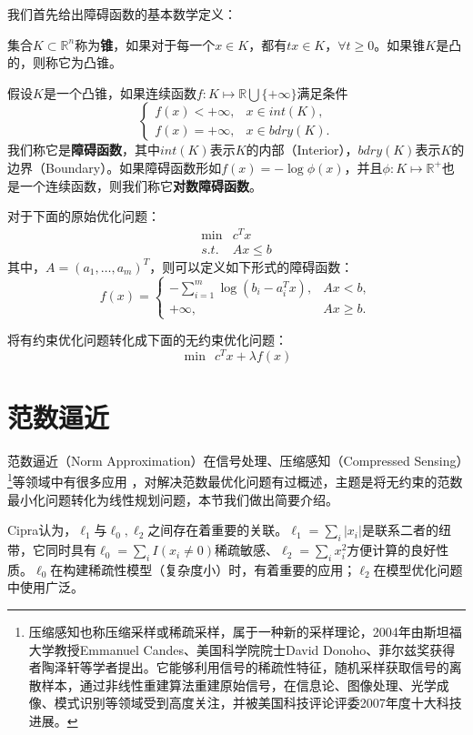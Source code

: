 我们首先给出障碍函数的基本数学定义：
\begin{definition}\label{def:cone}
集合$K\subset \mathbb{R}^n$称为\textbf{锥}，如果对于每一个$x\in K$，都有$tx\in K$，$\forall t\ge 0$。如果锥$K$是凸的，则称它为凸锥。
\end{definition}

\begin{definition}\label{def:barrier}
假设$K$是一个凸锥，如果连续函数$f:K \mapsto \mathbb R \bigcup \{+\infty\}$满足条件
\[
    \left\{
    \begin{array}{ll}
      f(x) < +\infty, & x\in int(K), \\
      f(x) = +\infty, & x\in bdry(K).
    \end{array}
    \right.
\]
我们称它是\textbf{障碍函数}，其中$int(K)$表示$K$的内部（Interior），$bdry(K)$表示$K$的边界（Boundary）。如果障碍函数形如$f(x) = -\log\phi(x)$，并且$\phi: K \mapsto \mathbb R^{+}$也是一个连续函数，则我们称它\textbf{对数障碍函数}\cite{frisch1955logarithmic}。
\end{definition}

对于下面的原始优化问题：
\begin{equation}
    \begin{array}{ll}
      \min & c^T x \\
      \textit{s.t.} & Ax \le b
    \end{array}
\end{equation}
其中，$A=(a_1,\ldots, a_m)^T$，则可以定义如下形式的障碍函数：
\begin{equation}\label{eq:barrierfunction}
    f(x) = \left\{
    \begin{array}{rl}
      -\sum\limits_{i=1}^m \log(b_i - a_i^T x), & Ax < b, \\
      +\infty, & Ax \ge b.
    \end{array}
    \right.
\end{equation}

将有约束优化问题转化成下面的无约束优化问题：
\[
    \min~~c^T x + \lambda f(x)
\]

\section{范数逼近}
范数逼近（Norm Approximation）在信号处理、压缩感知（Compressed Sensing）\footnote{压缩感知也称压缩采样或稀疏采样，属于一种新的采样理论，2004年由斯坦福大学教授Emmanuel Candes、美国科学院院士David Donoho、菲尔兹奖获得者陶泽轩等学者提出。它能够利用信号的稀疏性特征，随机采样获取信号的离散样本，通过非线性重建算法重建原始信号，在信息论、图像处理、光学成像、模式识别等领域受到高度关注，并被美国科技评论评委2007年度十大科技进展。}等领域中有很多应用
\cite{cipra2006l1}，\cite{grant2006disciplinedconvex}对解决范数最优化问题有过概述，主题是将无约束的范数最小化问题转化为线性规划问题，本节我们做出简要介绍。

Cipra认为\cite{cipra2006l1}，$\ell_1$与$\ell_0,\ell_2$之间存在着重要的关联。$\ell_1 = \sum\limits_i |x_i|$是联系二者的纽带，它同时具有$\ell_0=\sum\limits_i I(x_i \ne 0)$稀疏敏感、$\ell_2 = \sum\limits_i x_i^2$方便计算的良好性质。$\ell_0$在构建稀疏性模型（复杂度小）时，有着重要的应用；$\ell_2$在模型优化问题中使用广泛。

